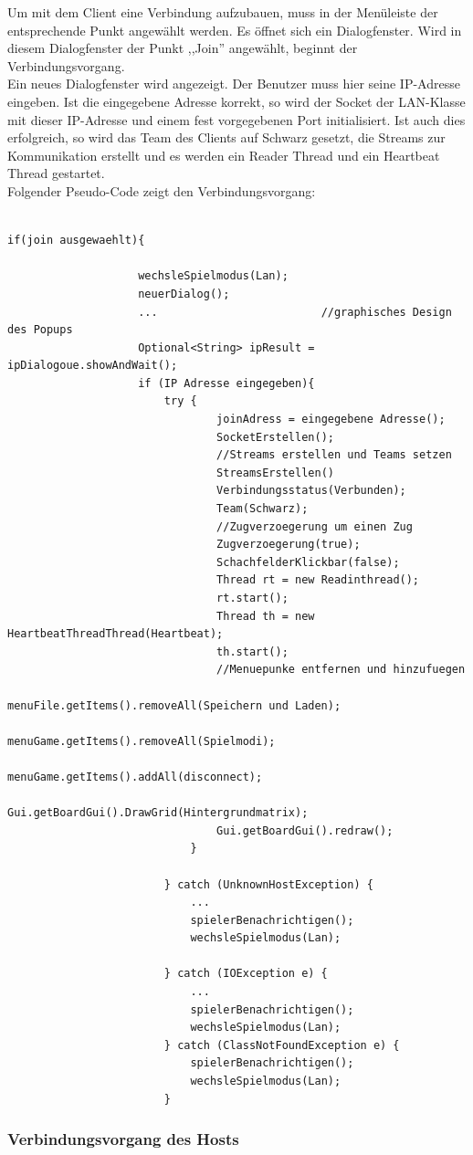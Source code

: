 \documentclass[12pt,a4paper]{article}
\begin{document}
Um mit dem Client eine Verbindung aufzubauen, muss in der Menüleiste der entsprechende Punkt angewählt werden. Es öffnet sich ein Dialogfenster. Wird in diesem Dialogfenster der Punkt ,,Join'' angewählt, beginnt der Verbindungsvorgang. \\[2ex]
Ein neues Dialogfenster wird angezeigt. Der Benutzer muss hier seine IP-Adresse eingeben. 
Ist die eingegebene Adresse korrekt, so wird der Socket der LAN-Klasse mit dieser IP-Adresse und einem fest vorgegebenen Port initialisiert. 
Ist auch dies erfolgreich, so wird das Team des Clients auf Schwarz gesetzt, die Streams zur Kommunikation erstellt und es werden ein Reader Thread und ein Heartbeat Thread gestartet.\\[2ex]

Folgender Pseudo-Code zeigt den Verbindungsvorgang: \\
\lstset{language=Java}
\begin{lstlisting}

if(join ausgewaehlt){				

					wechsleSpielmodus(Lan);				
					neuerDialog();
					...							//graphisches Design des Popups
					Optional<String> ipResult = ipDialogoue.showAndWait();
					if (IP Adresse eingegeben){										
						try {
								joinAdress = eingegebene Adresse();
								SocketErstellen();
								//Streams erstellen und Teams setzen	
								StreamsErstellen()
								Verbindungsstatus(Verbunden);
								Team(Schwarz);			
								//Zugverzoegerung um einen Zug		
								Zugverzoegerung(true);
								SchachfelderKlickbar(false);
								Thread rt = new Readinthread();  		
								rt.start();
								Thread th = new HeartbeatThreadThread(Heartbeat);
								th.start();
								//Menuepunke entfernen und hinzufuegen
								menuFile.getItems().removeAll(Speichern und Laden);
								menuGame.getItems().removeAll(Spielmodi);		
								menuGame.getItems().addAll(disconnect);	
								Gui.getBoardGui().DrawGrid(Hintergrundmatrix);		
								Gui.getBoardGui().redraw();
							}

						} catch (UnknownHostException) {
							...
							spielerBenachrichtigen();
							wechsleSpielmodus(Lan);		
							
						} catch (IOException e) {
							...
							spielerBenachrichtigen();
							wechsleSpielmodus(Lan);		
						} catch (ClassNotFoundException e) {
							spielerBenachrichtigen();
							wechsleSpielmodus(Lan);		
						}
\end{lstlisting}

\subsubsection{Verbindungsvorgang des Hosts}
\label{SUBSUBSEC:CONHOST}
\end{document}
